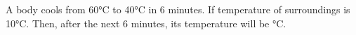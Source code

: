 \item A body cools from 60°C to 40°C in 6 minutes. If temperature of surroundings is 10°C. Then, after the next 6 minutes, its temperature will be \underline{\hspace{2.5cm}}°C.